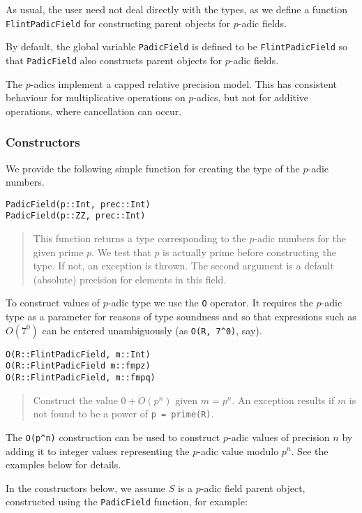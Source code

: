 \documentclass[a4paper,10pt]{article}
\newcommand{\code}{\lstinline}
\newcommand{\desc}[1]{\vspace{-3mm}\begin{quote}#1\end{quote}}
\begin{document}
{{As usual, the user need not deal directly with the types, as we define a function
\code{FlintPadicField} for constructing parent objects for $p$-adic fields.

By default, the global variable \code{PadicField} is defined to be
\code{FlintPadicField} so that \code{PadicField} also constructs parent objects
for $p$-adic fields.

The $p$-adics implement a capped relative precision model. This has consistent
behaviour for multiplicative operations on $p$-adics, but not for additive
operations, where cancellation can occur.

\subsubsection{Constructors}

We provide the following simple function for creating the type of the $p$-adic
numbers.

\begin{lstlisting}
PadicField(p::Int, prec::Int)
PadicField(p::ZZ, prec::Int)
\end{lstlisting}

\desc{This function returns a type corresponding to the $p$-adic numbers for
the given prime $p$. We test that $p$ is actually prime before constructing
the type. If not, an exception is thrown. The second argument is a default
(absolute) precision for elements in this field.}

To construct values of $p$-adic type we use the \code{O} operator. It requires
the $p$-adic type as a parameter for reasons of type soundness and so that
expressions such as $O(7^0)$ can be entered unambiguously (as \code{O(R, 7^0)},
say).

\begin{lstlisting}
O(R::FlintPadicField, m::Int)
O(R::FlintPadicField m::fmpz)
O(R::FlintPadicField, m::fmpq)
\end{lstlisting}

\desc{Construct the value $0 + O(p^n)$ given $m = p^n$. An exception results
if $m$ is not found to be a power of \code{p = prime(R)}.}

The \code{O(p^n)} construction can be used to construct $p$-adic values of
precision $n$ by adding it to integer values representing the $p$-adic value
modulo $p^n$. See the examples below for details.

In the constructors below, we assume $S$ is a $p$-adic field parent object,
constructed using the \code{PadicField} function, for example:

}}
\end{document}
